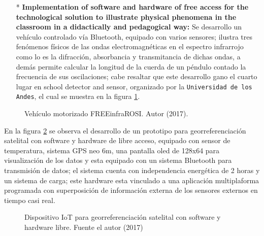 \documentclass[jou]{apa6} %
\begin{document}
\begin{enumerate}
\item[*] \textbf{Implementation of software and hardware of free access for the technological solution to illustrate physical phenomena in the classroom in a didactically and pedagogical way: }Se desarrollo un vehículo controlado vía Bluetooth, equipado con varios sensores; ilustra tres fenómenos físicos de las ondas electromagnéticas en el espectro infrarrojo  como lo es la difracción, absorbancia y transmitancia de dichas ondas, a demás permite calcular la longitud de la cuerda de un péndulo contado la frecuencia de sus oscilaciones; cabe resaltar que este desarrollo gano el cuarto lugar en school detector and sensor, organizado por la \texttt{Universidad de los Andes}, el cual se muestra en la figura \ref{fig:carro}. 
\end{enumerate}

\begin{figure}[htb]
  \centering
\setlength\fboxsep{0pt}
\setlength\fboxrule{0.5pt}
  \caption{\footnotesize Vehículo motorizado FREEinfraROSI. Autor (2017).}
  \label{fig:carro}  
\end{figure}

\bigskip

En la figura \ref{fig:IoT1} se observa el desarrollo de un prototipo para georreferenciación satelital con software y hardware de libre acceso, equipado con sensor de temperatura, sistema GPS neo 6m, una pantalla oled de 128x64 para visualización de los datos y esta equipado con un sistema Bluetooth para transmisión de datos; el sistema cuenta con independencia energética de 2 horas y un sistema de carga; este hardware esta vinculado a una aplicación multiplaforma programada con superposición de información externa de los sensores externos en tiempo casi real.

\begin{figure}[htb]
  \centering
\setlength\fboxsep{0pt}
\setlength\fboxrule{0.5pt}
  \caption{\footnotesize Dispositivo IoT para georreferenciación satelital con software y hardware libre. Fuente el autor (2017)}
  \label{fig:IoT1}  
\end{figure}
\end{document}
